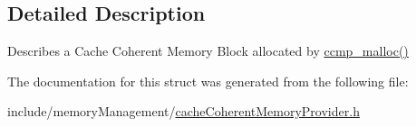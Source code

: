 \subsection{Detailed Description}
Describes a Cache Coherent Memory Block allocated by \hyperlink{cacheCoherentMemoryProvider_8cpp_a72b3227fd1265a06a6b65e36b4c370ee}{ccmp\+\_\+malloc()} 

The documentation for this struct was generated from the following file\+:\begin{DoxyCompactItemize}
\item 
include/memory\+Management/\hyperlink{cacheCoherentMemoryProvider_8h}{cache\+Coherent\+Memory\+Provider.\+h}\end{DoxyCompactItemize}
